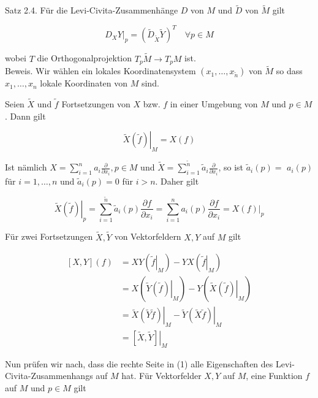 \documentclass[10pt, letterpaper]{article}
\begin{document}
Satz 2.4. Für die Levi-Civita-Zusammenhänge $D$ von $M$ und $\tilde{D}$ von $\tilde{M}$ gilt


\begin{equation*}
\left.D_{X} Y\right|_{p}=\left(\tilde{D}_{\tilde{X}} \tilde{Y}\right)^{T} \quad \forall p \in M \tag{1}
\end{equation*}


wobei $T$ die Orthogonalprojektion $T_{p} \tilde{M} \rightarrow T_{p} M$ ist.\\
Beweis. Wir wählen ein lokales Koordinatensystem $\left(x_{1}, \ldots, x_{\tilde{n}}\right)$ von $\tilde{M}$ so dass $x_{1}, \ldots, x_{n}$ lokale Koordinaten von $M$ sind.

Seien $\tilde{X}$ und $\tilde{f}$ Fortsetzungen von $X$ bzw. $f$ in einer Umgebung von $M$ und $p \in M$. Dann gilt


\begin{equation*}
\left.\tilde{X}(\tilde{f})\right|_{M}=X(f) \tag{2}
\end{equation*}


Ist nämlich $X=\sum_{i=1}^{n} a_{i} \frac{\partial}{\partial x_{i}}, p \in M$ und $\tilde{X}=\sum_{i=1}^{\tilde{n}} \tilde{a}_{i} \frac{\partial}{\partial x_{i}}$, so ist $\tilde{a}_{i}(p)=$ $a_{i}(p)$ für $i=1, \ldots, n$ und $\tilde{a}_{i}(p)=0$ für $i>n$. Daher gilt

$$
\left.\tilde{X}(\tilde{f})\right|_{p}=\sum_{i=1}^{\tilde{n}} \tilde{a}_{i}(p) \frac{\partial f}{\partial x_{i}}=\sum_{i=1}^{n} a_{i}(p) \frac{\partial f}{\partial x_{i}}=\left.X(f)\right|_{p}
$$

Für zwei Fortsetzungen $\tilde{X}, \tilde{Y}$ von Vektorfeldern $X, Y$ auf $M$ gilt


\begin{align*}
{[X, Y](f) } & =X Y\left(\left.\tilde{f}\right|_{M}\right)-Y X\left(\left.\tilde{f}\right|_{M}\right) \\
& =X\left(\left.\tilde{Y}(\tilde{f})\right|_{M}\right)-Y\left(\left.\tilde{X}(\tilde{f})\right|_{M}\right) \\
& =\left.\tilde{X}(\tilde{Y} \tilde{f})\right|_{M}-\left.\tilde{Y}(\tilde{X} \tilde{f})\right|_{M} \\
& =\left.[\tilde{X}, \tilde{Y}]\right|_{M} \tag{3}
\end{align*}


Nun prüfen wir nach, dass die rechte Seite in (1) alle Eigenschaften des Levi-Civita-Zusammenhangs auf $M$ hat. Für Vektorfelder $X, Y$ auf $M$, eine Funktion $f$ auf $M$ und $p \in M$ gilt
\end{document}
